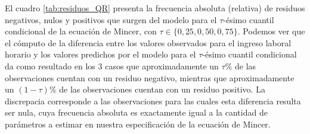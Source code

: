 \documentclass[11pt]{article}
\begin{document}
El cuadro \ref{tab:residuos_QR} presenta la frecuencia absoluta (relativa) de residuos negativos, nulos y positivos que surgen del modelo para el $\tau$-ésimo cuantil condicional de la ecuación de Mincer, con $\tau\in\{0,25,0,50,0,75\}$. Podemos ver que el cómputo de la diferencia entre los valores observados para el ingreso laboral horario y los valores predichos por el modelo para el $\tau$-ésimo cuantil condicional da como resultado en los 3 casos que aproximadamente un $\tau\%$ de las observaciones cuentan con un residuo negativo, mientras que aproximadamente un $(1-\tau)\%$ de las observaciones cuentan con un residuo positivo. La discrepacia corresponde a las observaciones para las cuales esta diferencia resulta ser nula, cuya frecuencia absoluta es exactamente igual a la cantidad de parámetros a estimar en nuestra especificación de la ecuación de Mincer.
\end{document}
